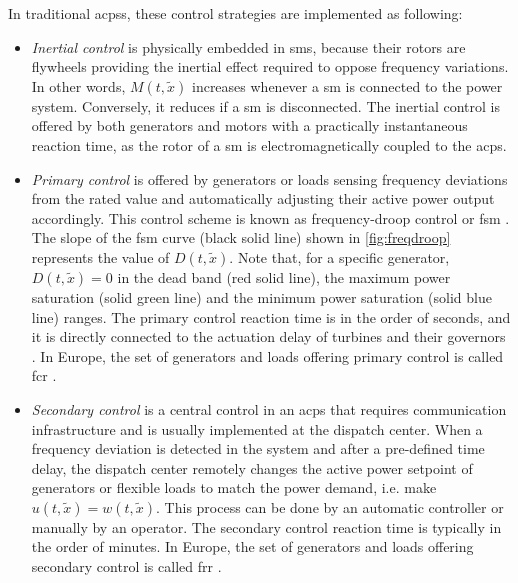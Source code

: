 \documentclass[utf8]{frontiersSCNS} %
\begin{document}
In traditional \glspl{acps}, these control strategies are implemented as following:

\begin{itemize}
    \item \textit{Inertial control} is physically embedded in \glspl{sm}, because their rotors are flywheels providing the inertial effect required to oppose frequency variations. In other words, $ M(t, \widetilde{x}) $ increases whenever a \gls{sm} is connected to the power system. Conversely, it reduces if a \gls{sm} is disconnected. The inertial control is offered by both generators and motors with a practically instantaneous reaction time, as the rotor of a \gls{sm} is electromagnetically coupled to the \gls{acps}.
    
    \item \textit{Primary control} is offered by generators or loads sensing  frequency deviations from the rated value and automatically adjusting their active power output accordingly. This control scheme is known as frequency-droop control \citep{IEEEStd154720182018} or \gls{fsm} \citep{comissionregulationeuNetworkCodeRequirements2016}. The slope of the \gls{fsm} curve (black solid line) shown in \cref{fig:freqdroop} represents the value of $ D(t,\widetilde{x}) $. Note that, for a specific generator, $ D(t,\widetilde{x}) = 0 $ in the dead band (red solid line), the maximum power saturation (solid green line) and the minimum power saturation (solid blue line) ranges. The primary control reaction time is in the order of seconds, and it is directly connected to the actuation delay of turbines and their governors \citep{etoFrequencyControlRequirements2018,entso-eFastFrequencyReserve2019}. In Europe, the set of generators and loads offering primary control is called \gls{fcr} \citep{comissionregulationeuGuidelineElectricityTransmission2017}.
    
    \item \textit{Secondary control} is a central control in an \gls{acps} that requires communication infrastructure and is usually implemented at the dispatch center. When a frequency deviation is detected in the system and after a pre-defined time delay, the dispatch center remotely changes the active power setpoint of generators or flexible loads to match the power demand, i.e. make $u(t,\widetilde{x}) = w(t,\widetilde{x})$. This process can be done by an automatic controller or manually by an operator. The secondary control reaction time is typically in the order of minutes. In Europe, the set of generators and loads offering secondary control is called \gls{frr} \citep{comissionregulationeuGuidelineElectricityTransmission2017}.
\end{itemize}
\end{document}
